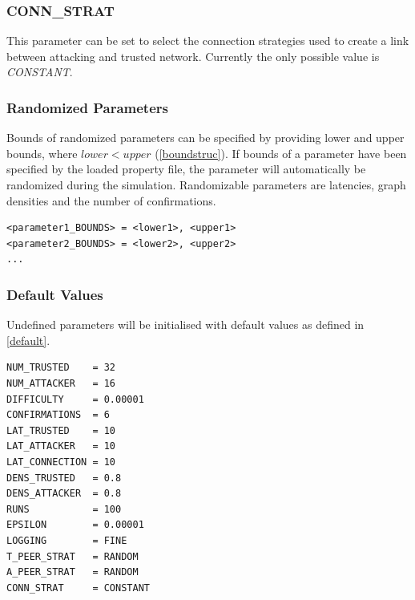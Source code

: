 \documentclass[a4paper,12pt,twoside]{report}
\begin{document}
\subsubsection{CONN\_STRAT}
This parameter can be set to select the connection strategies used to create a link between attacking and trusted network. Currently the only possible value is \textit{CONSTANT}.
\subsubsection{Randomized Parameters}
Bounds of randomized parameters can be specified by providing lower and upper bounds, where $lower < upper$ (\autoref{boundstruc}). If bounds of a parameter have been specified by the loaded property file, the parameter will automatically be randomized during the simulation. Randomizable parameters are latencies, graph densities and the number of confirmations.
\begin{lstlisting}[caption=Defining bounds of randomized parameters,label=boundstruc]
<parameter1_BOUNDS> = <lower1>, <upper1>
<parameter2_BOUNDS> = <lower2>, <upper2>
...
\end{lstlisting}
\subsubsection{Default Values}\label{defaultval}
Undefined parameters will be initialised with default values as defined in \autoref{default}. 
\begin{lstlisting}[caption=Default parameter values,label=default]
NUM_TRUSTED    = 32
NUM_ATTACKER   = 16
DIFFICULTY     = 0.00001
CONFIRMATIONS  = 6
LAT_TRUSTED    = 10
LAT_ATTACKER   = 10
LAT_CONNECTION = 10
DENS_TRUSTED   = 0.8
DENS_ATTACKER  = 0.8
RUNS           = 100
EPSILON        = 0.00001
LOGGING        = FINE
T_PEER_STRAT   = RANDOM
A_PEER_STRAT   = RANDOM
CONN_STRAT     = CONSTANT
\end{lstlisting}
\end{document}
